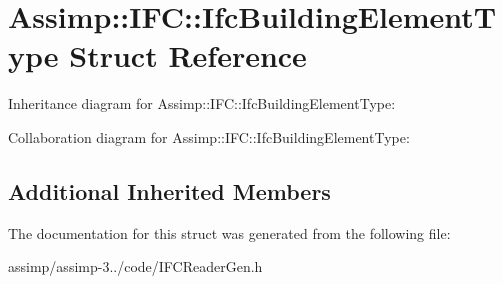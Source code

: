 \hypertarget{struct_assimp_1_1_i_f_c_1_1_ifc_building_element_type}{\section{Assimp\+:\+:I\+F\+C\+:\+:Ifc\+Building\+Element\+Type Struct Reference}
\label{struct_assimp_1_1_i_f_c_1_1_ifc_building_element_type}
}


Inheritance diagram for Assimp\+:\+:I\+F\+C\+:\+:Ifc\+Building\+Element\+Type\+:


Collaboration diagram for Assimp\+:\+:I\+F\+C\+:\+:Ifc\+Building\+Element\+Type\+:
\subsection*{Additional Inherited Members}


The documentation for this struct was generated from the following file\+:\begin{DoxyCompactItemize}
\item 
assimp/assimp-\/3../code/I\+F\+C\+Reader\+Gen.\+h\end{DoxyCompactItemize}
